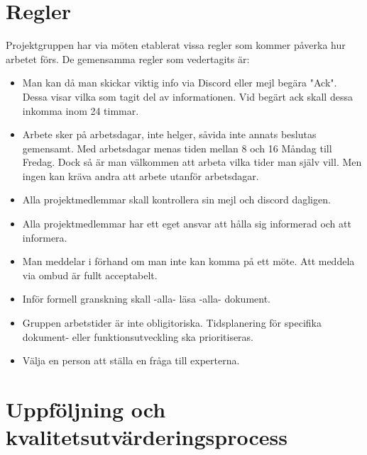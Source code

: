 \documentclass[paper=a4, fontsize=11pt,twoside]{article}
\begin{document}
\section{Regler}
Projektgruppen har via möten etablerat vissa regler som kommer påverka hur arbetet förs.
De gemensamma regler som vedertagits är: {\color{red}{Återkommer om huruvida "Vedertagits" är korrekt}}
\begin{itemize}
\item Man kan då man skickar viktig info via Discord eller mejl begära "Ack". Dessa visar vilka som tagit del av informationen. Vid begärt ack skall dessa inkomma inom 24 timmar.
\item Arbete sker på arbetsdagar, inte helger, såvida inte annats beslutas gemensamt. Med arbetsdagar menas tiden mellan 8 och 16 Måndag till Fredag. Dock så är man välkommen att arbeta vilka tider man själv vill. Men ingen kan kräva andra att arbete utanför arbetsdagar.
\item Alla projektmedlemmar skall kontrollera sin mejl och discord dagligen. 
\item Alla projektmedlemmar har ett eget ansvar att hålla sig informerad och att informera.
\item Man meddelar i förhand om man inte kan komma på ett möte. Att meddela via ombud är fullt acceptabelt.
\item Inför formell granskning skall -alla- läsa -alla- dokument. %
\item Gruppen arbetstider är inte obligitoriska. Tidsplanering för specifika
dokument- eller funktionsutveckling ska prioritiseras.
\item Välja en person att ställa en fråga till experterna. 
\end{itemize}

\section{Uppföljning och kvalitetsutvärderingsprocess}
\end{document}
